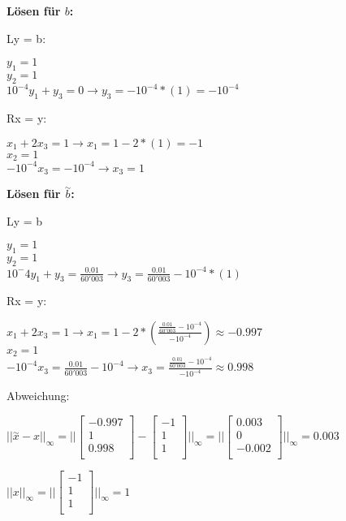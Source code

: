 \documentclass{article}
\begin{document}
\textbf{Lösen für \(b\):}

Ly = b:

\(y_1 = 1\)\\
\(y_2 = 1\)\\
\(10^{-4}y_1 + y_3 = 0 \rightarrow y_3 = -10^{-4}*(1) = -10^{-4}\)

Rx = y:

\(x_1 + 2x_3 = 1 \rightarrow x_1 = 1 - 2*(1) = -1\)\\
\(x_2 = 1\)\\
\(-10^{-4}x_3 = -10^{-4} \rightarrow x_3 = 1\)

\textbf{Lösen für \(\overset{\sim}{b}\):}

Ly = b

\(y_1 = 1\)\\
\(y_2 = 1\)\\
\(10^-4y_1 + y_3 = \frac{0.01}{60'003} \rightarrow y_3 = \frac{0.01}{60'003} - 10^{-4}*(1) \)

Rx = y:

\(x_1 + 2x_3 = 1 \rightarrow x_1 = 1 - 2*(\frac{\frac{0.01}{60'003} - 10^{-4}}{-10^{-4}}) \approx -0.997\)\\
\(x_2 = 1\)\\
\(-10^{-4}x_3 = \frac{0.01}{60'003} - 10^{-4} \rightarrow x_3 = \frac{\frac{0.01}{60'003} - 10^{-4}}{-10^{-4}} \approx 0.998\)

\newpage
Abweichung:

\(||\overset{\sim}{x} - x||_\infty = ||
\begin{bmatrix} 
-0.997\\
1\\
0.998\\
\end{bmatrix}
-
\begin{bmatrix} 
-1\\
1\\
1\\
\end{bmatrix}
||_\infty
=
||
\begin{bmatrix} 
0.003\\
0\\
-0.002\\
\end{bmatrix}
||_\infty
=
0.003\)

\(||x||_\infty =
||
\begin{bmatrix} 
-1\\
1\\
1\\
\end{bmatrix}
||_\infty
= 1
\)
\end{document}
